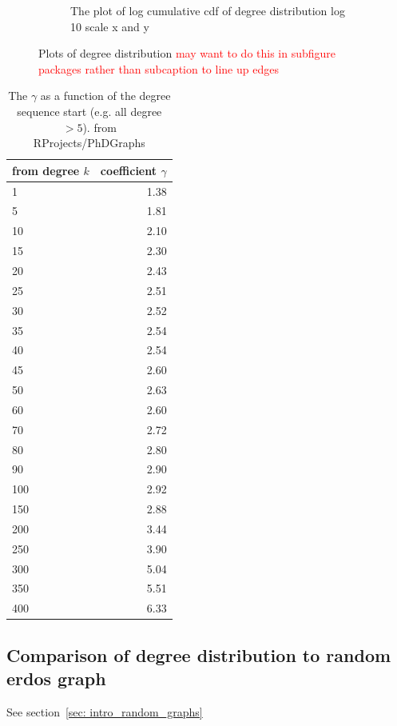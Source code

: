 \begin{figure}
\begin{subfigure}[t]{0.45\textwidth}
        \caption{The plot of log cumulative cdf of degree distribution log 10 scale x and y} \label{fig:log_degree_distribution}
    \end{subfigure}
    \caption{Plots of degree distribution \textcolor{red}{may want to do this in subfigure packages rather than subcaption to line up edges}}
\end{figure}

\begin{table}[ht]
\centering
\begin{tabular}{lr}
  \hline
  from degree $k$ & coefficient $\gamma$ \\ 
  \hline
1 & 1.38 \\ 
  5 & 1.81 \\ 
  10 & 2.10 \\ 
  15 & 2.30 \\ 
  20 & 2.43 \\ 
  25 & 2.51 \\ 
   30 & 2.52 \\ 
  35 & 2.54 \\ 
   40 & 2.54 \\ 
   45 & 2.60 \\ 
  50 & 2.63 \\ 
   60 & 2.60 \\ 
   70 & 2.72 \\ 
   80 & 2.80 \\ 
   90 & 2.90 \\ 
   100 & 2.92 \\ 
  150 & 2.88 \\ 
   200 & 3.44 \\ 
   250 & 3.90 \\ 
  300 & 5.04 \\ 
   350 & 5.51 \\ 
   400 & 6.33 \\ 
   \hline
\end{tabular}
\caption{The $\gamma$ as a function of the degree sequence start (e.g. all degree $>5$). from RProjects/PhDGraphs}
  \label{table:gamma}
\end{table}

\subsection{Comparison of degree distribution to random erdos graph}
See section~\ref{sec: intro_random_graphs}

